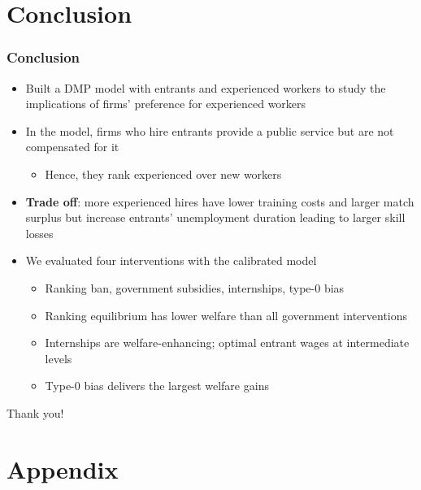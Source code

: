 \documentclass[9pt,xcolor={svgnames}]{beamer}
\begin{document}
\section{Conclusion} 

\begin{frame}
\frametitle{Conclusion}
   \begin{itemize}
\setlength\itemsep{1.8em}
    \item Built a DMP model with entrants and experienced workers to study the implications of firms' preference for experienced workers

    \item In the model, firms who hire entrants provide a public service but are not compensated for it
    \smallskip
    \begin{itemize}
    \item Hence, they rank experienced over new workers
    \end{itemize}
    
    \item \textbf{Trade off}: more experienced hires have lower training costs and larger match surplus but increase entrants' unemployment duration leading to larger skill losses
    
    \item We evaluated four interventions with the calibrated model
    \smallskip
    \begin{itemize}
    \item Ranking ban, government subsidies, internships, type-0 bias
    \item Ranking equilibrium has lower welfare than all government interventions
    \item Internships are welfare-enhancing; optimal entrant wages at intermediate levels
    \item Type-0 bias delivers the largest welfare gains
    \end{itemize}

\end{itemize}
\end{frame}




\begin{frame}
\centering
\huge{Thank you!}
\end{frame}


\section{Appendix} 
\end{document}
